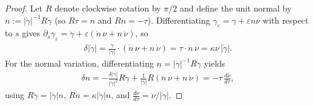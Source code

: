 \documentclass{amsart}
\theoremstyle{plain}
\begin{document}
\begin{proof}
Let $R$ denote clockwise rotation by $\pi/2$ and define the unit normal by $n:=|\dot\gamma|^{-1}R\dot\gamma$ (so $R\tau=n$ and $Rn=-\tau$).
Differentiating $\gamma_\varepsilon=\gamma+\varepsilon n \nu$ with respect to $s$ gives $\partial_s\gamma_\varepsilon=\dot\gamma+\varepsilon(\dot n\,\nu+n\,\dot \nu)$, so
  \begin{align}
    \delta|\dot\gamma|
    = \frac{\dot\gamma}{|\dot\gamma|}\cdot(\dot n\,\nu+n\,\dot \nu)
    = \tau\cdot\dot n\,\nu
    = \kappa \nu\,|\dot\gamma|.
  \end{align}
For the normal variation, differentiating $n=|\dot\gamma|^{-1}R\dot\gamma$ yields
  \begin{align}
    \delta n
    = -\frac{\delta|\dot\gamma|}{|\dot\gamma|^2}R\dot\gamma + \frac{1}{|\dot\gamma|}R(\dot n\,\nu+n\,\dot \nu)
    = -\tau\,\frac{d\nu}{d\tau},
  \end{align}
using $R\dot\gamma=|\dot\gamma|n$, $R\dot n=\kappa|\dot\gamma|n$, and $\frac{d\nu}{d\tau} = \dot \nu/|\dot\gamma|$.
\end{proof}
\end{document}
